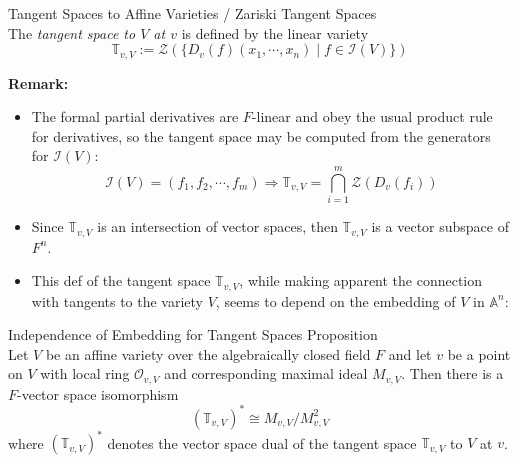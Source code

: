 \begin{definition}{Tangent Spaces to Affine Varieties / Zariski Tangent Spaces}\\
The \textit{tangent space to $V$ at $v$} is defined by the linear variety
\[
\mathbb{T}_{v,V} := \mathcal{Z} (\{ D_v(f) (x_1 ,\cdots, x_n) \mid f\in \mathcal{I} (V)\})
\]
\end{definition}

\noindent\textbf{Remark:} \begin{itemize}
    \item The formal partial derivatives are $F$-linear and obey the usual product rule for derivatives, so the tangent space may be computed from the generators for $\mathcal{I} (V)$:
    \[
    \mathcal{I} (V)= (f_1 ,f_2, \cdots, f_m) \Rightarrow \mathbb{T}_{v,V}= \bigcap_{i=1}^m \mathcal{Z} (D_v (f_i))
    \]

    \item Since $\mathbb{T}_{v,V}$ is an intersection of vector spaces, then $\mathbb{T}_{v,V}$ is a vector subspace of $F^n$.

    \item This def of the tangent space $\mathbb{T}_{v,V}$, while making apparent the connection with tangents to the variety $V$, seems to depend on the embedding of $V$ in $\mathbb{A}^n$:
\end{itemize}

\begin{proposition}{Independence of Embedding for Tangent Spaces Proposition}\\
Let $V$ be an affine variety over the algebraically closed field $F$ and let $v$ be a point on $V$ with local ring $\mathcal{O}_{v,V}$ and corresponding maximal ideal $M_{v,V}$. Then there is a $F$-vector space isomorphism
$$(\mathbb{T}_{v,V})^* \cong M_{v,V}/ M_{v,V}^2$$
where $(\mathbb{T}_{v,V})^*$ denotes the vector space dual of the tangent space $\mathbb{T}_{v,V}$ to $V$ at $v$.
\end{proposition}

